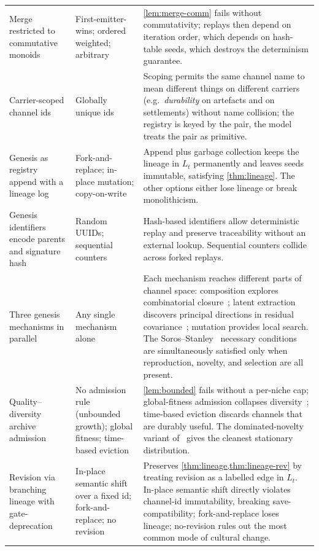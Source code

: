 \documentclass[journal,onecolumn,11pt]{IEEEtran}
\theoremstyle{definition}
\begin{document}
\begin{longtable}{L{0.25\textwidth} L{0.25\textwidth} L{0.40\textwidth}}
Merge restricted to commutative monoids
& First-emitter-wins; ordered weighted; arbitrary
& \cref{lem:merge-comm} fails without commutativity; replays then depend on iteration order, which depends on hash-table seeds, which destroys the determinism guarantee. \\
Carrier-scoped channel ids
& Globally unique ids
& Scoping permits the same channel name to mean different things on different carriers (e.g.\ \emph{durability} on artefacts and on settlements) without name collision; the registry is keyed by the pair, the model treats the pair as primitive. \\
Genesis as registry append with a lineage log
& Fork-and-replace; in-place mutation; copy-on-write
& Append plus garbage collection keeps the lineage in $L_t$ permanently and leaves seeds immutable, satisfying \cref{thm:lineage}. The other options either lose lineage or break monolithicism. \\
Genesis identifiers encode parents and signature hash
& Random UUIDs; sequential counters
& Hash-based identifiers allow deterministic replay and preserve traceability without an external lookup. Sequential counters collide across forked replays. \\
Three genesis mechanisms in parallel
& Any single mechanism alone
& Each mechanism reaches different parts of channel space: composition explores combinatorial closure~\cite{arthur2009}; latent extraction discovers principal directions in residual covariance~\cite{griffiths2011}; mutation provides local search. The Soros--Stanley~\cite{soros2014} necessary conditions are simultaneously satisfied only when reproduction, novelty, and selection are all present. \\
Quality--diversity archive admission
& No admission rule (unbounded growth); global fitness; time-based eviction
& \cref{lem:bounded} fails without a per-niche cap; global-fitness admission collapses diversity~\cite{lehman2011}; time-based eviction discards channels that are durably useful. The dominated-novelty variant of~\cite{lim2025} gives the cleanest stationary distribution. \\
Revision via branching lineage with gate-deprecation
& In-place semantic shift over a fixed id; fork-and-replace; no revision
& Preserves \cref{thm:lineage,thm:lineage-rev} by treating revision as a labelled edge in $L_t$. In-place semantic shift directly violates channel-id immutability, breaking save-compatibility; fork-and-replace loses lineage; no-revision rules out the most common mode of cultural change. \\

\end{longtable}
\end{document}
